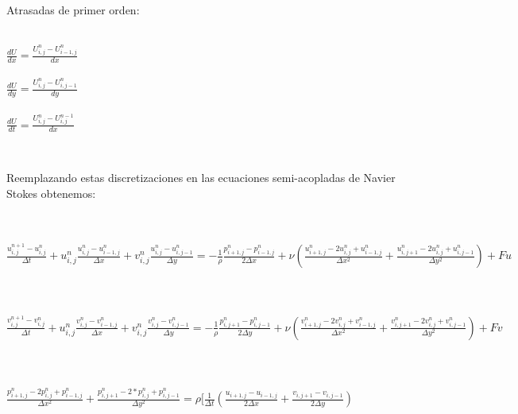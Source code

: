 \begin{minipage}{\linewidth}


Atrasadas de primer orden:
\begin{center}

~\\
$\frac{dU}{dx} = \frac{U^{n}_{i,j} - U^{n}_{i-1,j}}{dx} $
~\\
~\\
$\frac{dU}{dy} = \frac{U^{n}_{i,j} - U^{n}_{i,j-1}}{dy} $
~\\
~\\
$\frac{dU}{dt} = \frac{U^{n}_{i,j} - U^{n-1}_{i,j}}{dx} $
~\\
\end{center}
\end{minipage}
~\\

\begin{minipage}{\linewidth}

Reemplazando estas discretizaciones en las ecuaciones semi-acopladas de Navier Stokes obtenemos: 
\begin{center}
~\\

~\\
$\frac{u_{i,j}^{n+1}-u_{i,j}^{n}}{\Delta t}+u_{i,j}^{n}\frac{u_{i,j}^{n}-u_{i-1,j}^{n}}{\Delta x}+v_{i,j}^{n}\frac{u_{i,j}^{n}-u_{i,j-1}^{n}}{\Delta y}
=-\frac{1}{\rho}\frac{p_{i+1,j}^{n}-p_{i-1,j}^{n}}{2\Delta x}+\nu (\frac{u_{i+1,j}^{n}-2u_{i,j}^{n}+u_{i-1,j}^{n}}{\Delta x^2}+\frac{u_{i,j+1}^{n}-2u_{i,j}^{n}+u_{i,j-1}^{n}}{\Delta y^2}) + Fu$
~\\
~\\
~\\

$\frac{v_{i,j}^{n+1}-v_{i,j}^{n}}{\Delta t}+u_{i,j}^{n}\frac{v_{i,j}^{n}-v_{i-1,j}^{n}}{\Delta x}+v_{i,j}^{n}\frac{v_{i,j}^{n}-v_{i,j-1}^{n}}{\Delta y}=-\frac{1}{\rho}\frac{p_{i,j+1}^{n}-p_{i,j-1}^{n}}{2\Delta y}
+\nu(\frac{v_{i+1,j}^{n}-2v_{i,j}^{n}+v_{i-1,j}^{n}}{\Delta x^2}+\frac{v_{i,j+1}^{n}-2v_{i,j}^{n}+v_{i,j-1}^{n}}{\Delta y^2}) + Fv$
~\\
~\\
~\\

$\frac{p_{i+1,j}^{n}-2p_{i,j}^{n}+p_{i-1,j}^{n}}{\Delta x^2}+\frac{p_{i,j+1}^{n}-2*p_{i,j}^{n}+p_{i,j-1}^{n}}{\Delta y^2} 
=\rho[\frac{1}{\Delta t}(\frac{u_{i+1,j}-u_{i-1,j}}{2\Delta x}+\frac{v_{i,j+1}-v_{i,j-1}}{2\Delta y})$
\end{center}

\end{minipage}
~\\
~\\

